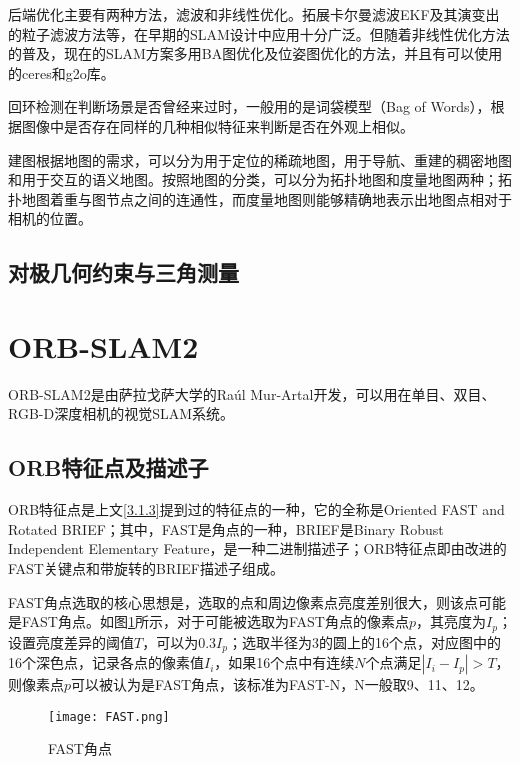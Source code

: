 后端优化主要有两种方法，滤波和非线性优化。拓展卡尔曼滤波EKF及其演变出的粒子滤波方法等，在早期的SLAM设计中应用十分广泛。但随着非线性优化方法的普及，现在的SLAM方案多用BA图优化及位姿图优化的方法，并且有可以使用的ceres和g2o库。

回环检测在判断场景是否曾经来过时，一般用的是词袋模型（Bag of Words）\cite{zhang2010understanding}，根据图像中是否存在同样的几种相似特征来判断是否在外观上相似。

建图根据地图的需求，可以分为用于定位的稀疏地图，用于导航、重建的稠密地图和用于交互的语义地图。按照地图的分类，可以分为拓扑地图和度量地图两种；拓扑地图着重与图节点之间的连通性，而度量地图则能够精确地表示出地图点相对于相机的位置。


\subsection{对极几何约束与三角测量} \label{3.1.4}


\section{ORB-SLAM2}

ORB-SLAM2是由萨拉戈萨大学的Raúl Mur-Artal开发，可以用在单目、双目、RGB-D深度相机的视觉SLAM系统。

\subsection{ORB特征点及描述子} \label{3.2.1}

ORB特征点是上文\ref{3.1.3}提到过的特征点的一种，它的全称是Oriented FAST and Rotated BRIEF；其中，FAST是角点的一种，BRIEF是Binary Robust Independent Elementary Feature，是一种二进制描述子；ORB特征点即由改进的FAST关键点和带旋转的BRIEF描述子组成。

FAST角点选取的核心思想是，选取的点和周边像素点亮度差别很大，则该点可能是FAST角点。如图\ref{fig7}所示，对于可能被选取为FAST角点的像素点$p$，其亮度为$I_p$；设置亮度差异的阈值$T$，可以为$0.3I_p$；选取半径为3的圆上的16个点，对应图中的16个深色点，记录各点的像素值$I_i$，如果16个点中有连续$N$个点满足$|I_i-I_p|>T$，则像素点$p$可以被认为是FAST角点，该标准为FAST-N，N一般取9、11、12\cite{Gao2017SLAM}。

\begin{figure}[!ht]
	\centering
	\texttt{[image: FAST.png]}
	\caption{FAST角点} 
	\label{fig7}
\end{figure}

